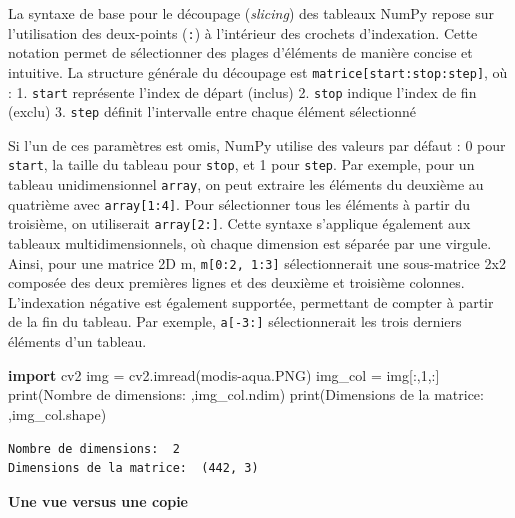 \documentclass[
]{article}
\newenvironment{Shaded}{}{}
\newcommand{\BuiltInTok}[1]{\textcolor[rgb]{0.00,0.50,0.00}{#1}}
\newcommand{\DecValTok}[1]{\textcolor[rgb]{0.25,0.63,0.44}{#1}}
\newcommand{\ImportTok}[1]{\textcolor[rgb]{0.00,0.50,0.00}{\textbf{#1}}}
\newcommand{\NormalTok}[1]{#1}
\newcommand{\OperatorTok}[1]{\textcolor[rgb]{0.40,0.40,0.40}{#1}}
\newcommand{\StringTok}[1]{\textcolor[rgb]{0.25,0.44,0.63}{#1}}
\begin{document}
La syntaxe de base pour le découpage (\emph{slicing}) des tableaux NumPy
repose sur l'utilisation des deux-points (\texttt{:}) à l'intérieur des
crochets d'indexation. Cette notation permet de sélectionner des plages
d'éléments de manière concise et intuitive. La structure générale du
découpage est \texttt{matrice{[}start:stop:step{]}}, où : 1.
\texttt{start} représente l'index de départ (inclus) 2. \texttt{stop}
indique l'index de fin (exclu) 3. \texttt{step} définit l'intervalle
entre chaque élément sélectionné

Si l'un de ces paramètres est omis, NumPy utilise des valeurs par défaut
: 0 pour \texttt{start}, la taille du tableau pour \texttt{stop}, et 1
pour \texttt{step}. Par exemple, pour un tableau unidimensionnel
\texttt{array}, on peut extraire les éléments du deuxième au quatrième
avec \texttt{array{[}1:4{]}}. Pour sélectionner tous les éléments à
partir du troisième, on utiliserait \texttt{array{[}2:{]}}. Cette
syntaxe s'applique également aux tableaux multidimensionnels, où chaque
dimension est séparée par une virgule. Ainsi, pour une matrice 2D m,
\texttt{m{[}0:2,\ 1:3{]}} sélectionnerait une sous-matrice 2x2 composée
des deux premières lignes et des deuxième et troisième colonnes.
L'indexation négative est également supportée, permettant de compter à
partir de la fin du tableau. Par exemple, \texttt{a{[}-3:{]}}
sélectionnerait les trois derniers éléments d'un tableau.

\label{495de5e4}
\label{cb10}
\begin{Shaded}
\begin{Highlighting}[]
\ImportTok{import}\NormalTok{ cv2}
\NormalTok{img }\OperatorTok{=}\NormalTok{ cv2.imread(}\StringTok{\textquotesingle{}modis{-}aqua.PNG\textquotesingle{}}\NormalTok{)}
\NormalTok{img\_col }\OperatorTok{=}\NormalTok{ img[:,}\DecValTok{1}\NormalTok{,:]}
\BuiltInTok{print}\NormalTok{(}\StringTok{\textquotesingle{}Nombre de dimensions: \textquotesingle{}}\NormalTok{,img\_col.ndim)}
\BuiltInTok{print}\NormalTok{(}\StringTok{\textquotesingle{}Dimensions de la matrice: \textquotesingle{}}\NormalTok{,img\_col.shape)}
\end{Highlighting}
\end{Shaded}

\begin{verbatim}
Nombre de dimensions:  2
Dimensions de la matrice:  (442, 3)
\end{verbatim}

\textbf{Une vue versus une copie}
\end{document}
